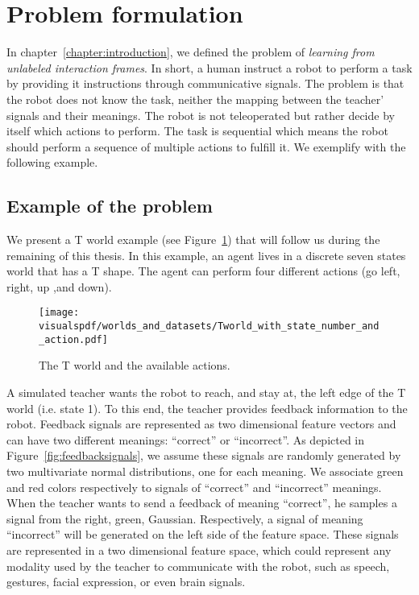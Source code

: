 \section{Problem formulation}

In chapter~\ref{chapter:introduction}, we defined the problem of \emph{learning from unlabeled interaction frames}. In short, a human instruct a robot to perform a task by providing it instructions through communicative signals. The problem is that the robot does not know the task, neither the mapping between the teacher' signals and their meanings. The robot is not teleoperated but rather decide by itself which actions to perform. The task is sequential which means the robot should perform a sequence of multiple actions to fulfill it. We exemplify with the following example.

\subsection{Example of the problem}
\label{chapter:lfui:example}

We present a T world example (see Figure~\ref{fig:Tworld}) that will follow us during the remaining of this thesis. In this example, an agent lives in a discrete seven states world that has a T shape. The agent can perform four different actions (go left, right, up ,and down).

\begin{figure}[!htbp]
  \centering
  \texttt{[image: \\visualspdf/worlds\_and\_datasets/Tworld\_with\_state\_number\_and\_action.pdf]}
  \caption{The T world and the available actions.}
  \label{fig:Tworld}
\end{figure}

A simulated teacher wants the robot to reach, and stay at, the left edge of the T world (i.e. state 1). To this end, the teacher provides feedback information to the robot. Feedback signals are represented as two dimensional feature vectors and can have two different meanings: ``correct'' or ``incorrect''. As depicted in Figure~\ref{fig:feedbacksignals}, we assume these signals are randomly generated by two multivariate normal distributions, one for each meaning. We associate green and red colors respectively to signals of ``correct'' and ``incorrect'' meanings. When the teacher wants to send a feedback of meaning ``correct'', he samples a signal from the right, green, Gaussian. Respectively, a signal of meaning ``incorrect'' will be generated on the left side of the feature space. These signals are represented in a two dimensional feature space, which could represent any modality used by the teacher to communicate with the robot, such as speech, gestures, facial expression, or even brain signals.

